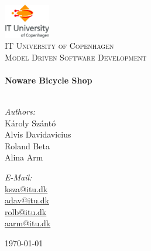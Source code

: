 
\begin{titlepage}

\begin{center}


\includegraphics[width=0.15\textwidth]{./itu_logo}\\[1cm]    

\textsc{\LARGE IT University of Copenhagen}\\[1.5cm]

\textsc{\Large Model Driven Software Development}\\[0.5cm]

\HRule \\[0.4cm]
{ \huge \bfseries Noware Bicycle Shop}\\[0.4cm]

\HRule \\[1.5cm]

\begin{minipage}{0.4\textwidth}
\begin{flushleft} \large
\emph{Authors:}\\
K\'aroly Sz\'ant\'o\\
Alvis Davidavicius\\
Roland Beta\\
Alina Arm\\
\end{flushleft}
\end{minipage}
\begin{minipage}{0.4\textwidth}
\begin{flushright} \large
\emph{E-Mail:} \\
\href{mailto:ksza@itu.dk}{ksza@itu.dk}\\
\href{mailto:adav@itu.dk}{adav@itu.dk}\\
\href{mailto:rolb@itu.dk}{rolb@itu.dk}\\
\href{mailto:aarm@itu.dk}{aarm@itu.dk}\\
\end{flushright}
\end{minipage}

\vfill

{\large \today}

\end{center}

\end{titlepage}